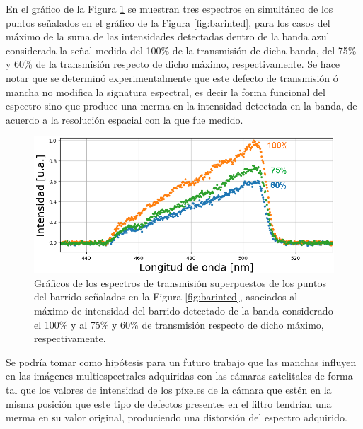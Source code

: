 En el gráfico de la Figura \ref{fig:merrmmin} se muestran tres espectros en simultáneo de los puntos señalados en el gráfico de la Figura \ref{fig:barinted}, para los casos del máximo de la suma de las intensidades detectadas dentro de la banda azul considerada la señal medida del 100\% de la transmisión de dicha banda, del 75\% y 60\% de la transmisión respecto de dicho máximo, respectivamente. Se hace notar que se determinó experimentalmente que este defecto de transmisión ó mancha no modifica la signatura espectral, es decir la forma funcional del espectro sino que produce una merma en la intensidad detectada en la banda, de acuerdo a la resolución espacial con la que fue medido. 

 \begin{figure}[H]
	\centering
	\includegraphics[width=1.0\textwidth]{Figs/microespectrometro/variacionintensidaddefecto.png}
	\caption{Gráficos de los espectros de transmisión superpuestos de los puntos del barrido señalados en la Figura \ref{fig:barinted}, asociados al máximo de intensidad del barrido detectado de la banda considerado el 100\% y al 75\% y 60\% de transmisión respecto de dicho máximo, respectivamente.}
	\label{fig:merrmmin}
\end{figure}

Se podría tomar como hipótesis para un futuro trabajo que las manchas influyen en las imágenes multiespectrales adquiridas con las cámaras satelitales de forma tal que los valores de intensidad de los píxeles de la cámara que estén en la misma posición que este tipo de defectos presentes en el filtro tendrían una merma en su valor original, produciendo una distorsión del espectro adquirido.



